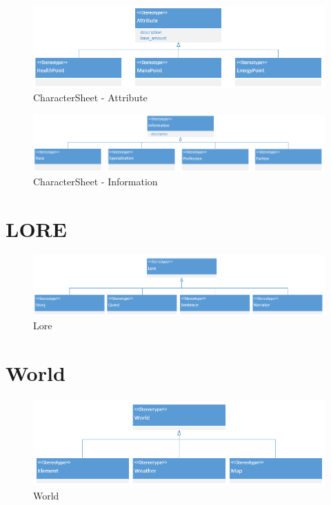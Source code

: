 \begin{figure}[H]
    \begin{center}
    \includegraphics[width=14cm]{10_img/Z_annexeA/cs_attribute.PNG} 
    \caption{CharacterSheet - Attribute}
    \label{A-Attribute}
    \end{center}
\end{figure}

\begin{figure}[H]
    \begin{center}
    \includegraphics[width=15cm]{10_img/Z_annexeA/cs_information.PNG} 
    \caption{CharacterSheet - Information}
    \label{A-Information}
    \end{center}
\end{figure}


\section{LORE} 
\begin{figure}[H]
    \begin{center}
    \includegraphics[width=15cm]{10_img/Z_annexeA/lore.PNG} 
    \caption{Lore}
    \label{A-Lore}
    \end{center}
\end{figure}


\section{World}
\begin{figure}[H]
    \begin{center}
    \includegraphics[width=14cm]{10_img/Z_annexeA/world.PNG} 
    \caption{World}
    \label{A-World}
    \end{center}
\end{figure}


